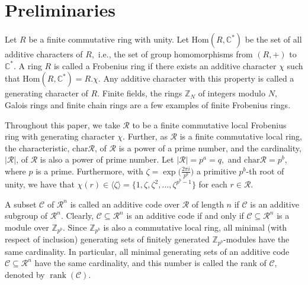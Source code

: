 \documentclass{article}
\DeclareMathOperator{\rank}{rank}
\newtheorem{prop}{Proposition}[section]
\theoremstyle{remark}
\theoremstyle{definition}
\numberwithin{equation}{section}
\begin{document}
\section{Preliminaries}\label{sec2}  Let $R$ be a finite commutative ring with unity. Let $\text{Hom}(R,\mathbb{C}^*)$ be the set of all additive characters of $R,$ i.e.,  the set of group homomorphisms from $(R,+)$ to $\mathbb{C}^*.$
 A ring $R$ is called a Frobenius ring if there exists an additive character $\chi$ such that  $\text{Hom}(R,\mathbb{C}^*)=R.\chi.$ Any additive character with this property is called a generating character of $R.$ Finite fields, the rings $\mathbb{Z}_N$ of integers modulo $N,$ Galois rings and finite chain rings are a few examples of finite Frobenius rings.
%

Throughout this paper, we take $\mathcal{R}$ to be a finite commutative local Frobenius ring with generating character $\chi.$  Further, as $\mathcal{R}$ is a finite commutative local ring, the characteristic, $\text{char}{\mathcal R}$, of $\mathcal{R}$  is a power of a prime number, and the cardinality, $|\mathcal{R}|$, of $\mathcal{R}$ is also a power of prime number. Let  $|\mathcal{R}|=p^a=q,$ and $\text{char}{\mathcal R}=p^b,$ where $p$ is a prime.   Furthermore, with $\zeta = \exp\bigl(\frac{2 \pi i}{p^b}\bigr)$ a primitive $p^b$-th root of unity, we have that $\chi(r)\in \langle \zeta\rangle=\{1,\zeta,\zeta^2,\ldots,\zeta^{p^b-1}\}$ for each $r \in \mathcal{R}.$ 
 
A subset $\mathcal{C}$ of $\mathcal{R}^{n}$ is called an additive code over $\mathcal{R}$ of length $n$ if $\mathcal{C}$ is an additive subgroup of $\mathcal{R}^{n}.$ Clearly, $\mathcal{C} \subseteq \mathcal{R}^{n}$ is an additive code if and only if $\mathcal{C} \subseteq \mathcal{R}^{n}$ is a module over $\mathbb{Z}_{p^b}.$ Since $\mathbb{Z}_{p^b}$ is also a commutative local ring, all minimal (with respect of inclusion) generating sets of finitely generated $\mathbb{Z}_{p^b}$-modules have the same cardinality. In particular, all minimal generating sets of an additive code $\mathcal{C} \subseteq \mathcal{R}^{n}$ have the same cardinality, and this number is called the rank of $\mathcal{C}$, denoted by $\rank(\mathcal{C}).$
\end{document}
